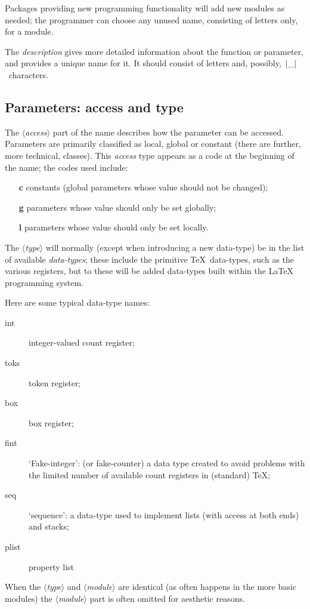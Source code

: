 \documentclass{article}
\providecommand \m [1]{$\langle$\textit{#1}$\rangle$}
\begin{document}
Packages providing new programming functionality will add new modules
as needed; the programmer can choose any unused name, consisting
of letters only, for a module.

The \textit{description} gives more detailed information about the
function or parameter, and provides a unique name for it.  It should
consist of letters and, possibly,~|_|~characters.

\subsection{Parameters: access and type}
\label{sec:parms}

The \m{access} part of the name describes how the parameter can be
accessed.  Parameters are primarily classified as local, global or
constant (there are further, more technical, classes).  This
\textit{access} type appears as a code at the beginning of the name;
the codes used include:
\begin{itemize}
\item[\bf c]
  constants (global parameters whose value should not be changed);
\item[\bf g]
  parameters whose value should only be set globally;
\item[\bf l]
  parameters whose value should only be set locally.
\end{itemize}

The \m{type} will normally (except when introducing a new data-type)
be in the list of available \textit{data-types}; these include the
primitive \TeX\ data-types, such as the various registers, but to
these will be added data-types built within the \LaTeX{} programming
system.

Here are some typical data-type names:
\begin{description}
\item[int] integer-valued count register;
\item[toks] token register;
\item[box] box register;
\item[fint] `Fake-integer': (or fake-counter) a data type created to
  avoid problems with the limited number of available count registers
  in (standard) \TeX;
\item[seq] `sequence': a data-type used to implement lists 
  (with access at both ends) and stacks;
\item[plist] property list
\end{description}
When the \m{type} and \m{module} are identical (as often happens in
the more basic modules) the \m{module} part is often omitted for
aesthetic reasons.
\end{document}
